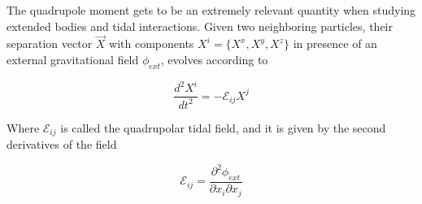 %
%
%
%
%
%
%
%
%

The quadrupole moment gets to be an extremely relevant quantity when studying extended bodies and tidal interactions. Given two neighboring particles, their separation vector $\vec{X}$ with components $X^i = \{X^x, X^y, X^z \} $ in presence of an external gravitational field $\phi_{ext}$, evolves according to 


\begin{equation}\label{tidal0}
\frac{d^2 X^{i}}{dt^2} = - \mathcal{E}_{ij} X^{j}
\end{equation} 

Where $\mathcal{E}_{ij}$ is called the quadrupolar tidal field, and it is given by the second derivatives of the field 

\begin{equation}
\mathcal{E}_{ij} = \frac{\partial^2 \phi_{ext}}{\partial x_i \partial x_j}
\end{equation}

